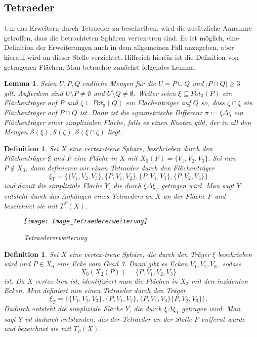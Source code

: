 \documentclass[12pt,titlepage,twoside,cleardoublepage]{article}
\theoremstyle{nummermitklammern}
\newtheorem{lemma}[temp]{Lemma}
\newtheorem{definition}[temp]{Definition}
\newtheorem{definition}[zahl]{Definition}
\newtheorem{lemma}[zahl]{Lemma}
\numberwithin{equation}{section}
\begin{document}
  \subsection{Tetraeder}
 Um das Erweitern durch Tetraeder zu beschreiben, wird die zusätzliche Annahme getroffen, dass die betrachteten Sphären vertex-treu sind. Es ist möglich, eine Definition der Erweiterungen auch in dem allgemeinen Fall anzugeben, aber hierauf wird an dieser Stelle verzichtet.
 Hilfreich hierfür ist die Definition von getragenen Flächen. Man betrachte zunächst folgendes Lemma.
\begin{lemma}
Seien $U,P,Q$ endliche Mengen für die $U=P\cup Q$ und $\vert P\cap Q \vert \geq 3$ gilt. Außerdem sind $U\setminus P\neq \emptyset$ und $U\setminus Q \neq \emptyset$. Weiter seien $\xi \subseteq Pot_3(P)$ ein Flächenträger auf P und $\zeta \subseteq Pot_3(Q)$ ein Flächenträger auf $Q$ so, dass $\zeta \cap \xi$ ein Flächenträger auf $P \cap Q$ ist. Dann ist die symmetrische Differenz $\pi :=\xi \Delta \zeta$ ein Flächenträger einer simplizialen Fläche, falls es einen Knoten gibt, der in all den Mengen $\mathcal{S}(\xi),\mathcal{S}(\zeta),\mathcal{S}(\xi\cap\zeta)$ liegt. 
\end{lemma}

\begin{definition}
Sei $X$ eine vertex-treue Sphäre, beschrieben durch den Flächenträger $\xi$ und $F$ eine Fläche in $X$ mit $X_0(F)=\{V_1,V_2,V_3\}.$ Sei nun $P\notin X_0$, dann definieren wir einen Tetraeder durch den Flächenträger
\[
\xi_T=\{\{V_1,V_2,V_3\},\{P,V_1,V_2\},\{P,V_1,V_3\},\{P,V_2,V_3\}\}
\] 
und damit die simpliziale Fläche $Y$, die durch $\xi \Delta \xi_T$ getragen wird. Man sagt $Y$ entsteht durch das Anhängen eines Tetraeders an $X$ an der Fläche $F$ und bezeichnet sie mit $T^F(X)$.
\begin{figure}[H]
\begin{center}
\texttt{[image: Image\_Tetraedererweiterung]}
\end{center}
\caption{Tetraedererweiterung}
\end{figure}

\end{definition}

\begin{definition}
Sei $X$ eine vertex-treue Sphäre, die durch den Träger $\xi$ beschrieben wird und $P\in X_0$ eine Ecke vom Grad 3. Dann gibt es Ecken $V_1,V_2,V_3,$ sodass
\[
X_0(X_2(P))=\{P,V_1,V_2,V_3\}
\] 
ist. Da $X$ vertex-treu ist, identifiziert man die Flächen in $X_2$  mit den inzidenten Ecken.  Man definiert nun einen Tetraeder durch den Träger 
\[
\xi_T=\{\{V_1,V_2,V_3\},\{P,V_1,V_2\},\{P,V_1,V_3\}\{P,V_2,V_3\}\}.
\]  Dadurch entsteht die simpliziale Fläche $Y$, die durch $\xi \Delta \xi_T$ getragen wird. Man sagt $Y$ ist dadurch entstanden, das der Tetraeder an der Stelle $P$ entfernt wurde und bezeichnet sie mit $T_P(X)$.
\end{definition}
\end{document}
